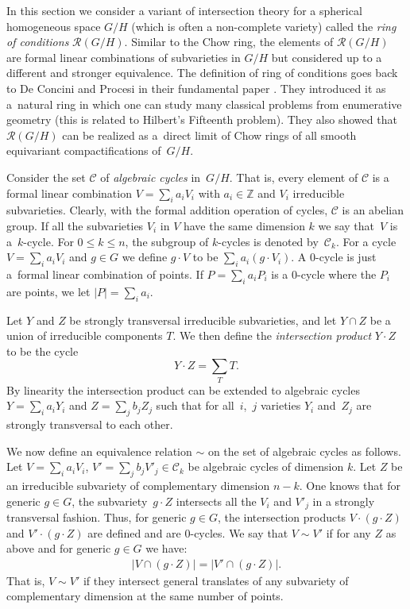 \documentclass[pdftex]{sigma}
\def \Z{\mathbb{Z}}
\numberwithin{equation}{section}
\theoremstyle{definition}
\begin{document}
In this section we consider a variant of intersection theory for a spherical homogeneous space $G/H$ (which is often a non-complete variety) called the {\it ring of conditions} $\mathcal{R}(G/H)$. Similar to the Chow ring, the elements of $\mathcal{R}(G/H)$ are formal linear combinations of subvarieties in $G/H$ but considered up to a different and stronger equivalence. The definition of ring of conditions goes back to De Concini and Procesi in their fundamental paper \cite{DP}. They introduced it as a~natural ring in which one can study many classical problems from enumerative geometry (this is related to Hilbert's Fifteenth problem). They also showed that~$\mathcal{R}(G/H)$ can be realized as a~direct limit of Chow rings of all smooth equivariant compactifications of~$G/H$.

Consider the set $\mathcal{C}$ of {\it algebraic cycles} in~$G/H$. That is, every element of $\mathcal{C}$ is a formal linear combination $V = \sum_i a_i V_i$ with $a_i \in \Z$ and $V_i$ irreducible subvarieties. Clearly, with the formal addition operation of cycles, $\mathcal{C}$ is an abelian group. If all the subvarieties $V_i$ in $V$ have the same dimension $k$ we say that~$V$ is a~$k$-cycle. For $0 \leq k \leq n$, the subgroup of $k$-cycles is denoted by~$\mathcal{C}_k$. For a cycle $V = \sum_i a_i V_i$ and $g \in G$ we define $g \cdot V$ to be $\sum_i a_i(g \cdot V_i)$. A $0$-cycle is just a~formal linear combination of points. If $P = \sum_i a_i P_i$ is a $0$-cycle where the $P_i$ are points, we let $|P| = \sum_i a_i$.

Let $Y$ and $Z$ be strongly transversal irreducible subvarieties, and let $Y \cap Z$ be a union of irreducible components $T$. We then define the {\it intersection product} $Y \cdot Z$ to be the cycle
\[
Y \cdot Z= \sum_T T.
\]
By linearity the intersection product can be extended to algebraic cycles $Y = \sum_i a_i Y_i$ and $Z = \sum_j b_j Z_j$ such that for all~$i$,~$j$ varieties $Y_i$ and~$Z_j$ are strongly transversal to each other.

We now define an equivalence relation $\sim$ on the set of algebraic cycles as follows. Let $V=\sum_i a_i V_i$, $V'=\sum_j b_j V'_j \in \mathcal{C}_k$ be algebraic cycles of dimension $k$. Let $Z$ be an irreducible sub\-va\-riety of complementary dimension $n - k$. One knows that for generic $g \in G$, the subvariety~$g \cdot Z$ intersects all the $V_i$ and $V'_j$ in a strongly transversal fashion. Thus, for generic $g \in G$, the intersection products $V \cdot (g \cdot Z)$ and $V' \cdot (g \cdot Z)$ are defined and are $0$-cycles. We say that $V \sim V'$ if
for any $Z$ as above and for generic $g \in G$ we have:
\begin{gather} %
 |V \cap (g \cdot Z)| = |V' \cap (g \cdot Z)|.
 \end{gather}
That is, $V \sim V'$ if they intersect general translates of any subvariety of complementary dimension at the same number of points.
\end{document}
